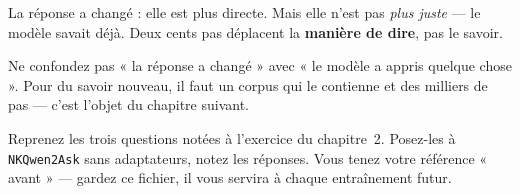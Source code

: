 La réponse a changé : elle est plus directe. Mais elle n'est pas \emph{plus
juste} — le modèle savait déjà. Deux cents pas déplacent la \textbf{manière de
dire}, pas le savoir.

\begin{nkretenir}
Ne confondez pas « la réponse a changé » avec « le modèle a appris quelque
chose ». Pour du savoir nouveau, il faut un corpus qui le contienne et des
milliers de pas — c'est l'objet du chapitre suivant.
\end{nkretenir}

\begin{nkexo}
Reprenez les trois questions notées à l'exercice du chapitre~2. Posez-les à
\texttt{NKQwen2Ask} sans adaptateurs, notez les réponses. Vous tenez votre
référence « avant » — gardez ce fichier, il vous servira à chaque entraînement
futur.
\end{nkexo}
